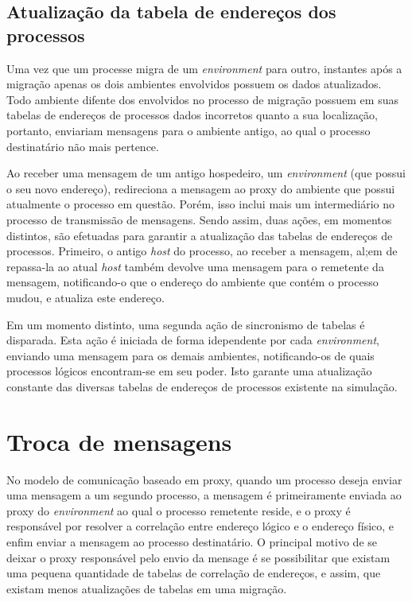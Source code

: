 \subsection{Atualização da tabela de endereços dos processos \label{atualizacao}}

Uma vez que um processe migra de um \textit{environment} para outro, instantes após a migração apenas os dois ambientes envolvidos possuem os dados atualizados. Todo ambiente difente dos envolvidos no processo de migração possuem em suas tabelas de endereços de processos dados incorretos quanto a sua localização, portanto, enviariam mensagens para o ambiente antigo, ao qual o processo destinatário não mais pertence.

Ao receber uma mensagem de um antigo hospedeiro, um \textit{environment} (que possui o seu novo endereço), redireciona a mensagem ao proxy do ambiente que possui atualmente o processo em questão. Porém, isso inclui mais um intermediário no processo de transmissão de mensagens. Sendo assim, duas ações, em momentos distintos, são efetuadas para garantir a atualização das tabelas de endereços de processos. Primeiro, o antigo \textit{host} do processo, ao receber a mensagem, al;em de repassa-la ao atual \textit{host} também devolve uma mensagem para o remetente da mensagem, notificando-o que o endereço do ambiente que contém o processo mudou, e atualiza este endereço.

Em um momento distinto, uma segunda ação de sincronismo de tabelas é disparada. Esta ação é iniciada de forma idependente por cada \textit{environment}, enviando uma mensagem para os demais ambientes, notificando-os de quais processos lógicos encontram-se em seu poder. Isto garante uma atualização constante das diversas tabelas de endereços de processos existente na simulação.

\section{Troca de mensagens \label{troca_mensagens}}

No modelo de comunicação baseado em proxy, quando um processo deseja enviar uma mensagem a um segundo processo, a mensagem é primeiramente enviada ao proxy do \textit{environment} ao qual o processo remetente reside, e o proxy é responsável por resolver a correlação entre endereço lógico e o endereço físico, e enfim enviar a mensagem ao processo destinatário. O principal motivo de se deixar o proxy responsável pelo envio da mensage é se possibilitar que existam uma pequena quantidade de tabelas de correlação de endereços, e assim, que existam menos atualizações de tabelas em uma migração.

